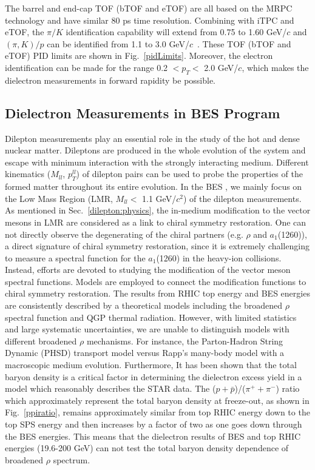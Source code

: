 The barrel and end-cap TOF (bTOF and eTOF) are all based on the MRPC technology and have similar 80 ps time resolution. Combining with iTPC and eTOF, the $\pi/K$ identification capability will extend from 0.75 to 1.60 GeV/$c$ and $(\pi,K)/p$ can be identified from 1.1 to 3.0 GeV/$c$~\cite{tofpid}. These TOF (bTOF and eTOF) PID limits are shown in Fig.~\ref{pidLimits}. Moreover, the electron identification can be made for the range 0.2 $<p_{T}<$ 2.0 GeV/$c$, which makes the dielectron measurements in forward rapidity be possible.

\subsection{Dielectron Measurements in BES \uppercase\expandafter{} Program}
Dilepton measurements play an essential role in the study of the hot and dense nuclear matter. Dileptons are produced in the whole evolution of the system and escape with minimum interaction with the strongly interacting medium. Different kinematics ($M_{ll}$, $p_{T}^{ll}$) of dilepton pairs can be used to probe the properties of the formed matter throughout its entire evolution. In the BES \uppercase\expandafter{}, we mainly focus on the Low Mass Region (LMR, $M_{ll}<$ 1.1 GeV/$c^{2}$) of the dilepton measurements. As mentioned in Sec.~\ref{dilepton:physics}, the in-medium modification to the vector mesons in LMR are considered as a link to chiral symmetry restoration. One can not directly observe the degenerating of the chiral partners (e.g. $\rho$ and $a_{1}$(1260)), a direct signature of chiral symmetry restoration, since it is extremely challenging to measure a spectral function for the $a_{1}$(1260) in the heavy-ion collisions. Instead, efforts are devoted to studying the modification 
of the vector meson spectral functions. Models are employed to connect the modification functions to chiral symmetry restoration. The results from RHIC top energy and BES \uppercase\expandafter{} energies are consistently described by a theoretical models including the broadened $\rho$ spectral function and QGP thermal radiation. However, with limited statistics and large systematic uncertainties, we are unable to distinguish models with different broadened $\rho$ mechanisms. For instance, the Parton-Hadron String Dynamic (PHSD) transport model versus Rapp's many-body model with a macroscopic medium evolution. Furthermore, It has been shown that the total baryon density is a critical factor in determining the dielectron excess yield in a model which reasonably describes the STAR data. The ($p+\bar{p}$)/($\pi^{+}+\pi^{-}$) ratio which approximately represent the total baryon density at freeze-out, as shown in Fig.~\ref{ppiratio}, remains approximately similar from top RHIC energy down to the top SPS energy and then increases by a factor of two as one goes down through the BES \uppercase\expandafter{} energies. This means that the dielectron results of BES \uppercase\expandafter{} and top RHIC energies (19.6-200 GeV) can not test the total baryon density dependence of broadened $\rho$ spectrum.

